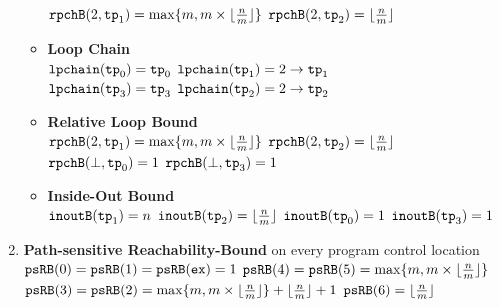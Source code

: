 \begin{enumerate}
\begin{itemize}
  \\
  $\mathtt{rpchB}(2, \mathtt{tp}_1) = \max\{m, m \times \lfloor\frac{n}{m}\rfloor\}$ \qquad
  $\mathtt{rpchB}(2, \mathtt{tp}_2) = \lfloor\frac{n}{m}\rfloor$ 
  \item \textbf{Loop Chain}
  \\
  $\mathtt{lpchain}(\mathtt{tp}_0) = \mathtt{tp}_0$ \qquad
  $\mathtt{lpchain}(\mathtt{tp}_1) = 2\to \mathtt{tp}_1$ \\
  $\mathtt{lpchain}(\mathtt{tp}_3) = \mathtt{tp}_3$ \qquad
  $\mathtt{lpchain}(\mathtt{tp}_2) = 2\to \mathtt{tp}_2$ 
  \item \textbf{{Relative Loop Bound}}
  \\
  $\mathtt{rpchB}(2, \mathtt{tp}_1) = \max\{m, m \times \lfloor\frac{n}{m}\rfloor\}$ \quad
  $\mathtt{rpchB}(2, \mathtt{tp}_2) = \lfloor\frac{n}{m}\rfloor$  \\
  $\mathtt{rpchB}(\bot, \mathtt{tp}_0) = 1$ \quad
  $\mathtt{rpchB}(\bot, \mathtt{tp}_3) = 1$ 
  \item \textbf{Inside-Out Bound}
  \\
  $\mathtt{inoutB}(\mathtt{tp}_1) = n$ \quad
  $\mathtt{inoutB}(\mathtt{tp}_2) = \lfloor\frac{n}{m}\rfloor$ \quad
  $\mathtt{inoutB}(\mathtt{tp}_0) = 1$ \quad
  $\mathtt{inoutB}(\mathtt{tp}_3) = 1$ 
\end{itemize}
\item \textbf{Path-sensitive Reachability-Bound} on every program control location
\\
$\mathtt{psRB}(0) = \mathtt{psRB}(1) = \mathtt{psRB}(\mathtt{ex}) = 1$ \qquad
$\mathtt{psRB}(4) = \mathtt{psRB}(5) = \max\{m, m \times \lfloor\frac{n}{m}\rfloor\}$ 
\\
$\mathtt{psRB}(3) = \mathtt{psRB}(2) = \max\{m, m \times \lfloor\frac{n}{m}\rfloor\} + \lfloor\frac{n}{m}\rfloor + 1 $
\quad $\mathtt{psRB}(6) = \lfloor\frac{n}{m}\rfloor$ 
\end{enumerate}